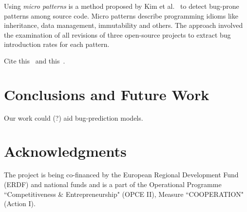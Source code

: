 \documentclass[conference]{IEEEtran}
\begin{document}
Using {\it micro patterns} is a method proposed by Kim et al.~\cite{KPW06}
to detect bug-prone patterns among source code. Micro patterns describe programming
idioms like inheritance, data management, immutability and others. The approach involved
the examination of all revisions of three open-source projects to extract bug
introduction rates for each pattern.



Cite this~\cite{ZAH11} and this~\cite{MNN11}.

\section{Conclusions and Future Work}
\label{sec:con}

Our work could (?) aid bug-prediction models.

\section*{Acknowledgments}

The project is being co-financed by the European Regional Development Fund (ERDF)
and national funds and is a part of the Operational Programme ``Competitiveness \&
Entrepreneurship" (OPCE II), Measure ``COOPERATION" (Action I).


 
\end{document}
